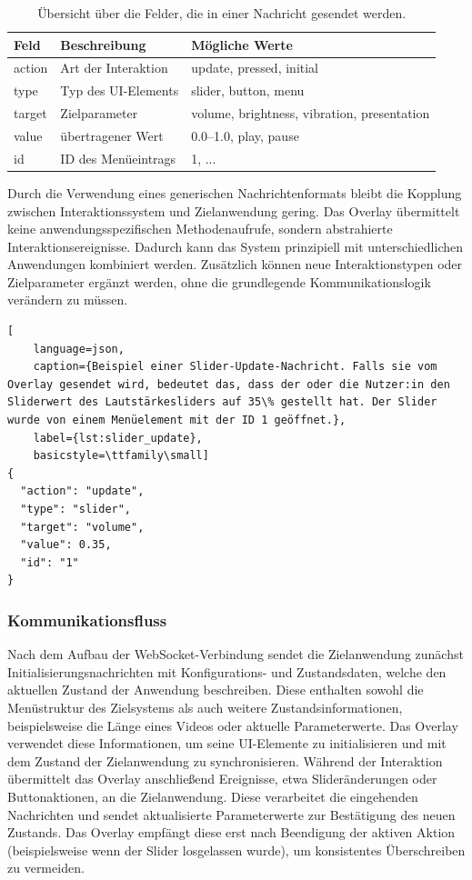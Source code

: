 \begin{table}[h]
\centering
\begin{tabular}{lll}
\toprule
Feld & Beschreibung & Mögliche Werte \\
\midrule
action & Art der Interaktion & update, pressed, initial \\
type & Typ des UI-Elements & slider, button, menu \\
target & Zielparameter & volume, brightness, vibration, presentation \\
value & übertragener Wert & 0.0–1.0, play, pause \\
id & ID des Menüeintrags & 1, ... \\
\bottomrule
\end{tabular}
\caption{Übersicht über die Felder, die in einer Nachricht gesendet werden.}
\label{tab:websocket_message}
\end{table}


Durch die Verwendung eines generischen Nachrichtenformats bleibt die Kopplung zwischen Interaktionssystem und Zielanwendung gering. Das Overlay übermittelt keine anwendungsspezifischen Methodenaufrufe, sondern abstrahierte Interaktionsereignisse. Dadurch kann das System prinzipiell mit unterschiedlichen Anwendungen kombiniert werden. Zusätzlich können neue Interaktionstypen oder Zielparameter ergänzt werden, ohne die grundlegende Kommunikationslogik verändern zu müssen.

\begin{lstlisting}[
    language=json,
    caption={Beispiel einer Slider-Update-Nachricht. Falls sie vom Overlay gesendet wird, bedeutet das, dass der oder die Nutzer:in den Sliderwert des Lautstärkesliders auf 35\% gestellt hat. Der Slider wurde von einem Menüelement mit der ID 1 geöffnet.},
    label={lst:slider_update},
    basicstyle=\ttfamily\small]
{
  "action": "update",
  "type": "slider",
  "target": "volume",
  "value": 0.35,
  "id": "1"
}
\end{lstlisting}

\subsubsection{Kommunikationsfluss}
Nach dem Aufbau der WebSocket-Verbindung sendet die Zielanwendung zunächst Initialisierungsnachrichten mit Konfigurations- und Zustandsdaten, welche den aktuellen Zustand der Anwendung beschreiben. Diese enthalten sowohl die Menüstruktur des Zielsystems als auch weitere Zustandsinformationen, beispielsweise die Länge eines Videos oder aktuelle Parameterwerte. Das Overlay verwendet diese Informationen, um seine UI-Elemente zu initialisieren und mit dem Zustand der Zielanwendung zu synchronisieren. Während der Interaktion übermittelt das Overlay anschließend Ereignisse, etwa Slideränderungen oder Buttonaktionen, an die Zielanwendung. Diese verarbeitet die eingehenden Nachrichten und sendet aktualisierte Parameterwerte zur Bestätigung des neuen Zustands. Das Overlay empfängt diese erst nach Beendigung der aktiven Aktion (beispielsweise wenn der Slider losgelassen wurde), um konsistentes Überschreiben zu vermeiden.

